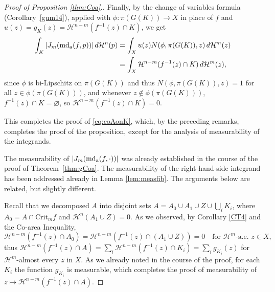 \documentclass[12pt,leqno]{amsart}
\theoremstyle{definition}
\newcommand{\bbbr}{\mathbb R}
\def\H{{\mathcal H}}
\def\md{\operatorname{md}}
\def\apmd{\operatorname{md_{\rm a}}}
\numberwithin{theorem}{section} \numberwithin{equation}{section}
\begin{document}
\begin{proof}[Proof of Proposition \ref{thm:Coa}.]
Finally, by the change of variables formula (Corollary~\ref{gum14}), applied with ${\phi:\pi(G(K))\to X}$ in place of $f$ and $u(z)=g_K(z)=\H^{n-m}(f^{-1}(z)\cap K)$, we get
\[
\begin{split}
\int_K|J_m(\apmd(f,p))|\,d\H^n(p)
&=
\int_X u(z)N(\phi,\pi(G(K)),z)\,d\H^m(z)\\
&=
\int_X \H^{n-m}(f^{-1}(z)\cap K)\,d\H^m(z),
\end{split}
\]
since $\phi$ is bi-Lipschitz on $\pi(G(K))$ and thus $N(\phi,\pi(G(K)),z)=1$ for all $z\in\phi(\pi(G(K)))$, and whenever $z\not\in\phi(\pi(G(K)))$, $f^{-1}(z)\cap K=\varnothing$, so $\H^{n-m}(f^{-1}(z)\cap K)=0$.

This completes the proof of \eqref{eq:coAonK},  which, by the preceding remarks, completes the proof of the proposition,  except for the analysis of measurability of the integrands.

The measurability of $|J_m(\apmd(f,\cdot))|$ was already established in the course of the proof of Theorem~\ref{thm:gCoa}.
The measurability of the right-hand-side integrand has been addressed already in Lemma \ref{lem:measfib}. The arguments below are related, but slightly different.

Recall that we decomposed $A$ into disjoint sets $A=A_0\cup A_1\cup Z\cup\bigcup_i K_i$, where $A_0=A\cap\mathrm{Crit}_m f$ and $\H^n(A_1\cup Z)=0$. As we observed, by Corollary \ref{CT4} and the Co-area Inequality,
$$
\H^{n-m}(f^{-1}(z)\cap A_0)=\H^{n-m}(f^{-1}(z)\cap (A_1\cup Z))=0 \quad \text{for }\H^m\text{-a.e.\ }z\in X,
$$
thus $\H^{n-m}(f^{-1}(z)\cap A)=\sum_i \H^{n-m}(f^{-1}(z)\cap K_i)=\sum_i g_{K_i}(z)$ for $\H^m$-almost every $z$ in $X$. As we already noted in the course of the proof, for each $K_i$ the function $g_{K_i}$ is measurable, which completes the proof of measurability of 
$z\mapsto\H^{n-m}(f^{-1}(z)\cap A)$.
\end{proof}
\end{document}
